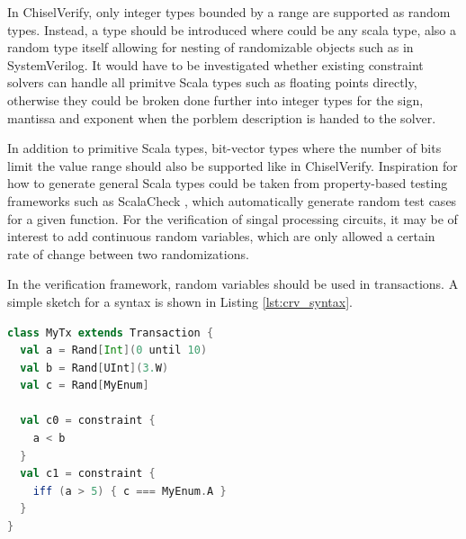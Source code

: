 In ChiselVerify, only integer types bounded by a range are supported as random types. Instead, a  type
should be introduced where  could be any scala type, also a random type itself allowing for nesting of
randomizable objects such as in SystemVerilog. It would have to be investigated whether existing constraint solvers
can handle all primitve Scala types such as floating points directly, otherwise they could be broken done further
into integer types for the sign, mantissa and exponent when the porblem description is handed to the solver.

In addition to primitive Scala types, bit-vector types where the number of bits limit the value range should also be
supported like in ChiselVerify. Inspiration for how to generate general Scala types could be taken from
property-based testing frameworks such as ScalaCheck \cite{scalacheck}, which automatically generate random test
cases for a given function. For the verification of singal processing circuits, it may be of interest to add
continuous random variables, which are only allowed a certain rate of change between two randomizations.

In the verification framework, random variables should be used in transactions. A simple sketch for a syntax is shown
in Listing \ref{lst:crv_syntax}.

\begin{listing}
\begin{lstlisting}[language=scala, captionpos=b, caption=Outline of the syntax for random variables and constraints.,label=lst:crv_syntax]
class MyTx extends Transaction {
  val a = Rand[Int](0 until 10)
  val b = Rand[UInt](3.W)
  val c = Rand[MyEnum]

  val c0 = constraint {
    a < b
  }
  val c1 = constraint {
    iff (a > 5) { c === MyEnum.A }
  }
}
\end{lstlisting}
\end{listing}

